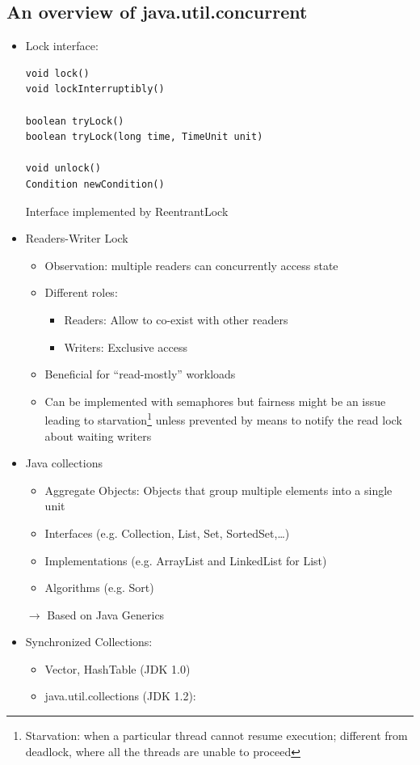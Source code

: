 \documentclass[a4paper]{article}
\begin{document}
\subsection{An overview of java.util.concurrent}
\begin{itemize}
\item Lock interface:
\begin{lstlisting}
void lock()
void lockInterruptibly()

boolean tryLock()
boolean tryLock(long time, TimeUnit unit)

void unlock()
Condition newCondition()
\end{lstlisting}
Interface implemented by ReentrantLock


\item Readers-Writer Lock
\begin{itemize}
\item Observation: multiple readers can concurrently access state
\item Different roles:
\begin{itemize}
\item Readers: Allow to co-exist with other readers
\item Writers: Exclusive access
\end{itemize}
\item Beneficial for ``read-mostly'' workloads
\item Can be implemented with semaphores but fairness might be an issue leading to starvation\footnote{Starvation: when a particular thread cannot resume execution; different from deadlock, where all the threads are unable to proceed}  unless prevented by means to notify the read lock about waiting writers
\end{itemize} 
\item Java collections
\begin{itemize}
\item Aggregate Objects: Objects that group multiple elements into a single unit
\item Interfaces (e.g. Collection, List, Set, SortedSet,\dots)
\item Implementations (e.g. ArrayList and LinkedList for List)
\item Algorithms (e.g. Sort)
\end{itemize}
$\to$ Based on Java Generics
\item Synchronized Collections: 
\begin{itemize}
\item Vector, HashTable (JDK 1.0)
\item java.util.collections (JDK 1.2):

\end{itemize}
\end{itemize}
\end{document}
